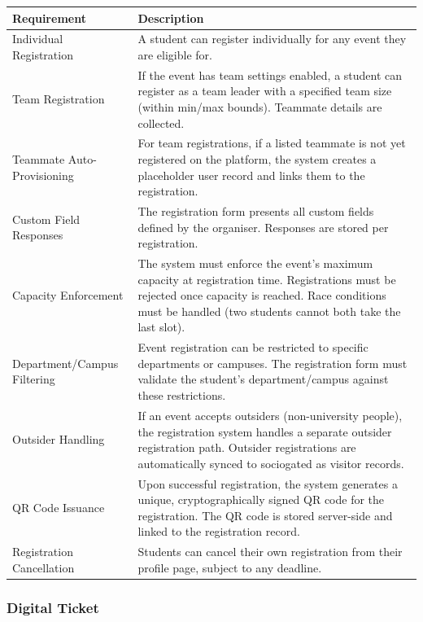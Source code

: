 \documentclass[12pt,a4paper]{article}
\begin{document}
\begin{tabularx}{\textwidth}{L{4cm} X}
\toprule
{}
\textbf{Requirement} & \textbf{Description} \\
\midrule
Individual Registration & A student can register individually for any event they are eligible for. \\
Team Registration & If the event has team settings enabled, a student can register as a team leader with a specified team size (within min/max bounds). Teammate details are collected. \\
Teammate Auto-Provisioning & For team registrations, if a listed teammate is not yet registered on the platform, the system creates a placeholder user record and links them to the registration. \\
Custom Field Responses & The registration form presents all custom fields defined by the organiser. Responses are stored per registration. \\
Capacity Enforcement & The system must enforce the event's maximum capacity at registration time. Registrations must be rejected once capacity is reached. Race conditions must be handled (two students cannot both take the last slot). \\
Department/Campus Filtering & Event registration can be restricted to specific departments or campuses. The registration form must validate the student's department/campus against these restrictions. \\
Outsider Handling & If an event accepts outsiders (non-university people), the registration system handles a separate outsider registration path. Outsider registrations are automatically synced to sociogated as visitor records. \\
QR Code Issuance & Upon successful registration, the system generates a unique, cryptographically signed QR code for the registration. The QR code is stored server-side and linked to the registration record. \\
Registration Cancellation & Students can cancel their own registration from their profile page, subject to any deadline. \\
\bottomrule
\end{tabularx}

\subsubsection{Digital Ticket}
\end{document}
